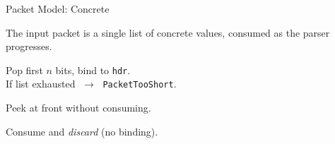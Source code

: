 \documentclass[aspectratio=169]{beamer}
\begin{document}
\begin{hidden}

\begin{frame}{Packet Model: Concrete}

  The input packet is a single list of concrete values, consumed as the
  parser progresses.

  \bigskip
  \centering

  \bigskip
  \raggedright
  \begin{description}
    \item[\texttt{extract(hdr)}]
      Pop first $n$ bits, bind to \texttt{hdr}.\\
      {\small If list exhausted $\;\to\;$
       \texttt{\textcolor{red!70!black}{PacketTooShort}}.}
    \item[\texttt{lookahead}]
      Peek at front without consuming.
    \item[\texttt{advance}]
      Consume and \emph{discard} (no binding).
  \end{description}
\end{frame}



\end{hidden}
\end{document}
